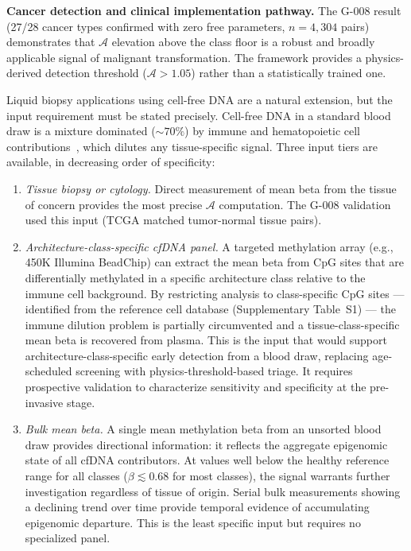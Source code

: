 \documentclass[12pt,a4paper]{article}
\newcommand{\Ascore}{\mathcal{A}}
\begin{document}
\textbf{Cancer detection and clinical implementation pathway.} The G-008 result
(27/28 cancer types confirmed with zero free parameters, $n = 4{,}304$ pairs)
demonstrates that $\Ascore$ elevation above the class floor is a robust and
broadly applicable signal of malignant transformation. The framework provides
a physics-derived detection threshold ($\Ascore > 1.05$) rather than a
statistically trained one.

Liquid biopsy applications using cell-free DNA are a natural extension, but
the input requirement must be stated precisely. Cell-free DNA in a standard
blood draw is a mixture dominated (${\sim}70\%$) by immune and hematopoietic
cell contributions~\cite{Snyder2016}, which dilutes any tissue-specific
signal. Three input tiers are available, in decreasing order of specificity:

\begin{enumerate}
\item \textit{Tissue biopsy or cytology.} Direct measurement of mean beta
from the tissue of concern provides the most precise $\Ascore$ computation.
The G-008 validation used this input (TCGA matched tumor-normal tissue pairs).

\item \textit{Architecture-class-specific cfDNA panel.} A targeted
methylation array (e.g., 450K Illumina BeadChip) can extract the mean beta
from CpG sites that are differentially methylated in a specific architecture
class relative to the immune cell background. By restricting analysis to
class-specific CpG sites — identified from the reference cell database
(Supplementary Table~S1) — the immune dilution problem is partially
circumvented and a tissue-class-specific mean beta is recovered from plasma.
This is the input that would support architecture-class-specific early
detection from a blood draw, replacing age-scheduled screening with
physics-threshold-based triage. It requires prospective validation to
characterize sensitivity and specificity at the pre-invasive stage.

\item \textit{Bulk mean beta.} A single mean methylation beta from an
unsorted blood draw provides directional information: it reflects the
aggregate epigenomic state of all cfDNA contributors. At values well
below the healthy reference range for all classes ($\beta \lesssim 0.68$
for most classes), the signal warrants further investigation regardless
of tissue of origin. Serial bulk measurements showing a declining trend
over time provide temporal evidence of accumulating epigenomic departure.
This is the least specific input but requires no specialized panel.
\end{enumerate}
\end{document}
